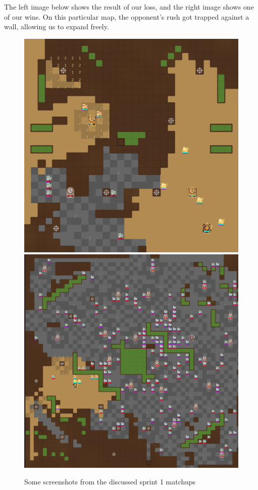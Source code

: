 The left image below shows the result of our loss, and the right image shows one of our wins. On this particular map, the opponent's rush got trapped against a wall, allowing us to expand freely.
\begin{figure}[H]
  \centering
  \includegraphics[scale=0.1]{images/sprint1_loss.png}
  \includegraphics[scale=0.1]{images/sprint1_win.png}
  \caption{Some screenshots from the discussed sprint 1 matchups}
\end{figure}
